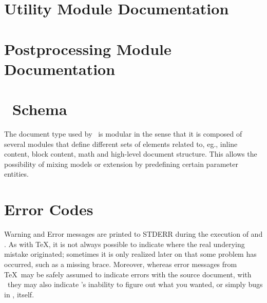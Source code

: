 \documentclass{book}
\begin{document}




\chapter[Utility Modules]{Utility Module Documentation}\label{utilitymodules}



\chapter[Postprocessing Modules]{Postprocessing Module Documentation}\label{postmodules}



\chapter[Schema]{\LaTeXML\ Schema}\label{schema}
The document type used by \LaTeXML\ is modular in the sense
that it is composed of several modules that define different
sets of elements related to, eg., inline content, block content,
math and high-level document structure.  This allows the possibility
of mixing models or extension by predefining certain parameter entities.



\chapter{Error Codes}\label{errorcodes}
Warning and Error messages are printed to STDERR during the execution
of  and .  As with \TeX, it is
not always possible to indicate where the real underying mistake
originated; sometimes it is only realized later on that some problem
has occurred, such as a missing brace. Moreover, whereas error messages
from \TeX\ may be safely assumed to indicate errors with the source
document, with \LaTeXML\ they may also indicate \LaTeXML's inability
to figure out what you wanted, or simply bugs in \LaTeXML, itself.
\end{document}
